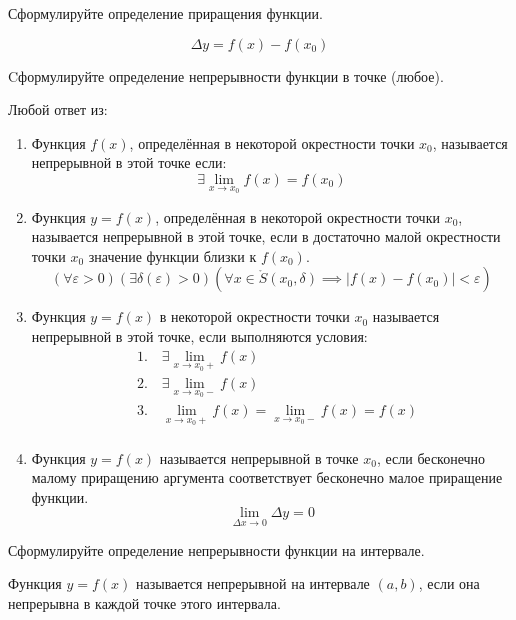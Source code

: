\begin{question}
  Сформулируйте определение приращения функции. 
\end{question}
\begin{answer}
  \[
  \Delta y = f(x) - f(x_0)
  \] 
\end{answer}

\begin{question}
  Cформулируйте определение непрерывности функции в точке (любое). 
\end{question}
\begin{answer}
  Любой ответ из:
  \begin{enumerate}
    \item Функция $f(x)$, определённая в некоторой окрестности точки $x_0$, называется непрерывной в этой точке если: \[
        \exists \lim_{x \to x_0} f(x) = f(x_0)
      \]
  
    \item Функция $y = f(x)$, определённая в некоторой окрестности точки $x_0$, называется непрерывной в этой точке, если в достаточно малой окрестности точки $x_0$ значение функции близки к $f(x_0)$.
      \[
        (\forall  \varepsilon > 0)(\exists \delta(\varepsilon) > 0)(\forall x \in \mathring{S}(x_0, \delta) \implies |f(x) - f(x_0)| < \varepsilon)
      \]
    
    \item Функция $y = f(x)$ в некоторой окрестности точки $x_0$ называется непрерывной в этой точке, если выполняются условия:
      \begin{align*}
        &1. \quad \exists \lim_{x \to x_0+} f(x) \\
        &2. \quad \exists \lim_{x \to x_0-} f(x) \\
        &3. \quad \lim_{x \to x_0+} f(x) = \lim_{x \to x_0-} f(x) = f(x) \\
      \end{align*}

    \item Функция $y = f(x)$ называется непрерывной в точке $x_0$, если бесконечно малому приращению аргумента соответствует бесконечно малое приращение функции. \[
      \lim_{\Delta x \to 0} \Delta y = 0
    \] 
  \end{enumerate}
\end{answer}

\begin{question}
  Сформулируйте определение непрерывности функции на интервале.
\end{question}
\begin{answer}
  Функция $y = f(x)$ называется непрерывной на интервале $(a, b)$, если она непрерывна в каждой точке этого интервала.
\end{answer}

